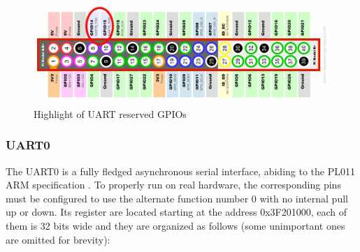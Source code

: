 \documentclass[12pt,a4paper,openright,twoside]{report}
\begin{document}
 \begin{figure}[t]
 \includegraphics[scale=0.143]{tesi2.jpg}
 \caption[Figure 2]{Highlight of UART reserved GPIOs}\label{fig:seconda}
 \end{figure}

\subsubsection{UART0}
The UART0 is a fully fledged asynchronous serial interface, abiding to the 
PL011 ARM specification \cite{pl011}. To properly run on real hardware, the
corresponding pins must be configured to use the alternate function number 0 with
no internal pull up or down.
Its register are located starting at the address 0x3F201000, each of them
is 32 bits wide and they are organized as follows (some unimportant ones are omitted for brevity):
\end{document}
